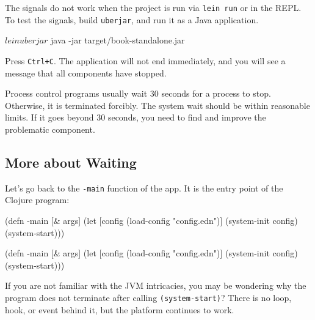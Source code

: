 The signals do not work when the project is run via \verb|lein run| or in the REPL. To test the signals, build \verb|uberjar|, and run it as a Java application.

\begin{english}
  \begin{bash}
$ lein uberjar
$ java -jar target/book-standalone.jar
  \end{bash}
\end{english}

Press \verb|Ctrl+C|. The application will not end immediately, and you will see a message that all components have stopped.

Process control programs usually wait 30 seconds for a process to stop. Otherwise, it is terminated forcibly. The system wait should be within reasonable limits. If it goes beyond 30 seconds, you need to find and improve the problematic component.

\subsection{More about Waiting}


Let's go back to the \verb|-main| function of the app. It is the entry point of the Clojure program:

\ifnarrow

\begin{english}
  \begin{clojure}
(defn -main [& args]
  (let [config
        (load-config "config.edn")]
    (system-init config)
    (system-start)))
  \end{clojure}
\end{english}

\else

\begin{english}
  \begin{clojure}
(defn -main [& args]
  (let [config (load-config "config.edn")]
    (system-init config)
    (system-start)))
  \end{clojure}
\end{english}

\fi

If you are not familiar with the JVM intricacies, you may be wondering why the program does not terminate after calling \verb|(system-start)|? There is no loop, hook, or event behind it, but the platform continues to work.



